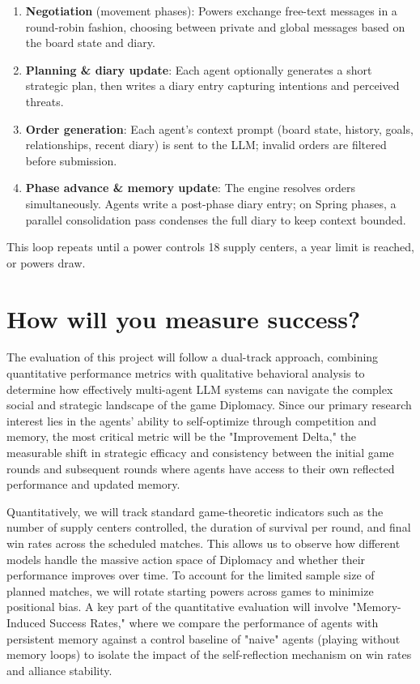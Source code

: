\documentclass[a4paper,oneside,bibliography=totoc]{scrbook}
\begin{document}
\begin{enumerate}
  \item \textbf{Negotiation} (movement phases): Powers exchange free-text messages in a round-robin fashion, choosing between private and global messages based on the board state and diary.
  \item \textbf{Planning \& diary update}: Each agent optionally generates a short strategic plan, then writes a diary entry capturing intentions and perceived threats.
  \item \textbf{Order generation}: Each agent's context prompt (board state, history, goals, relationships, recent diary) is sent to the LLM; invalid orders are filtered before submission.
  \item \textbf{Phase advance \& memory update}: The engine resolves orders simultaneously. Agents write a post-phase diary entry; on Spring phases, a parallel consolidation pass condenses the full diary to keep context bounded.
\end{enumerate}

\noindent This loop repeats until a power controls 18 supply centers, a year limit is reached, or powers draw.

\section{How will you measure success?}

The evaluation of this project will follow a dual-track approach, combining quantitative performance metrics with qualitative behavioral analysis to determine how effectively multi-agent LLM systems can navigate the complex social and strategic landscape of the game Diplomacy. Since our primary research interest lies in the agents' ability to self-optimize through competition and memory, the most critical metric will be the "Improvement Delta," the measurable shift in strategic efficacy and consistency between the initial game rounds and subsequent rounds where agents have access to their own reflected performance and updated memory.

Quantitatively, we will track standard game-theoretic indicators such as the number of supply centers controlled, the duration of survival per round, and final win rates across the scheduled matches. This allows us to observe how different models handle the massive action space of Diplomacy and whether their performance improves over time. To account for the limited sample size of planned matches, we will rotate starting powers across games to minimize positional bias. A key part of the quantitative evaluation will involve "Memory-Induced Success Rates," where we compare the performance of agents with persistent memory against a control baseline of "naive" agents (playing without memory loops) to isolate the impact of the self-reflection mechanism on win rates and alliance stability.
\end{document}
